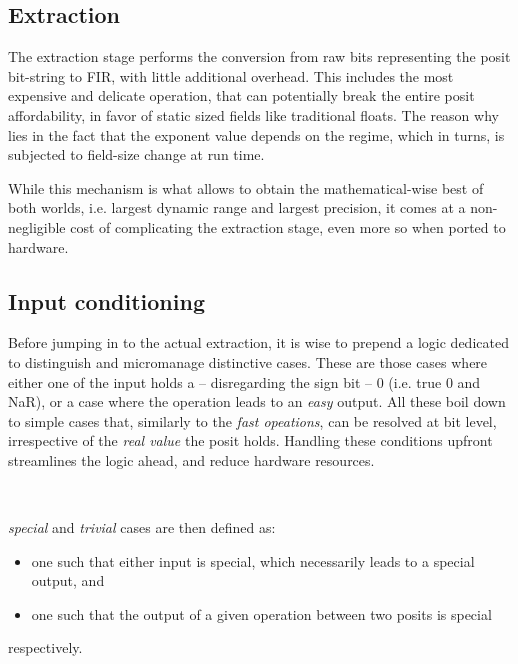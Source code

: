 \subsection{Extraction}\label{Extraction}


The extraction stage performs the conversion from raw bits representing the posit bit-string to FIR, with little additional overhead.
This includes the most expensive and delicate operation, that can potentially break the entire posit affordability, in favor of static sized fields like traditional floats.
The reason why lies in the fact that the exponent value depends on the regime, which in turns, is subjected to field-size change at run time. %




While this mechanism is what allows to obtain the mathematical-wise best of both worlds, i.e. largest dynamic range and largest precision, it comes at a non-negligible cost of complicating the extraction stage, even more so when ported to hardware.

\subsection{Input conditioning}\label{input_conditioning_section}

Before jumping in to the actual extraction, it is wise to prepend a logic dedicated to distinguish and micromanage distinctive cases. These are those cases where either one of the input holds a -- disregarding the sign bit -- $0$ (i.e. true $0$ and NaR), or a case where the operation leads to an \textit{easy} output. All these boil down to simple cases that, similarly to the \textit{fast opeations}, can be resolved at bit level, irrespective of the \textit{real value} the posit holds. Handling these conditions upfront streamlines the logic ahead, and reduce hardware resources.

\hypertarget{special_cases_link}{~}
\textit{special} and \textit{trivial} cases are then defined as:
\begin{itemize}
\item one such that either input is special, which necessarily leads to a special output, and
\item one such that the output of a given operation between two posits is special
\end{itemize}
respectively.

